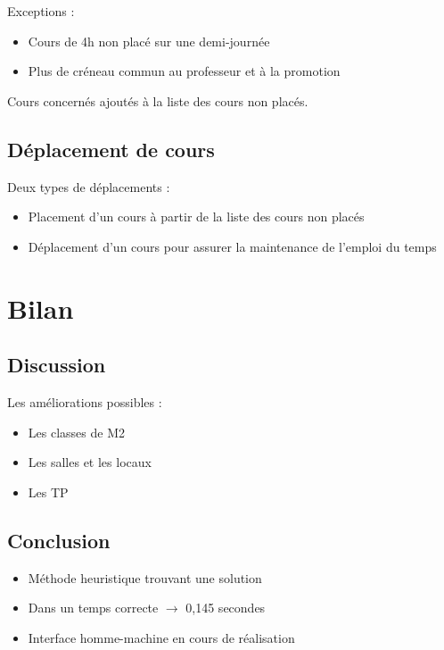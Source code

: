 \documentclass{beamer}
\begin{document}
\begin{frame}
Exceptions :
\begin{itemize}
\item Cours de 4h non placé sur une demi-journée
\item Plus de créneau commun au professeur et à la promotion\\
\end{itemize}
Cours concernés ajoutés à la liste des cours non placés.
\end{frame}

\subsection{Déplacement de cours}
\begin{frame}
Deux types de déplacements :
\begin{itemize}
\item Placement d'un cours à partir de la liste des cours non placés
\item Déplacement d'un cours pour assurer la maintenance de l'emploi du temps
\end{itemize}
\end{frame}

\section{Bilan}
\subsection{Discussion}
\begin{frame}
Les améliorations possibles : 
\begin{itemize}
\item Les classes de M2
\item Les salles et les locaux
\item Les TP
\end{itemize}
\end{frame}

\subsection{Conclusion}
\begin{frame}
\begin{itemize}
\item Méthode heuristique trouvant une solution\\
\item Dans un temps correcte $\rightarrow$ 0,145 secondes\\
\item Interface homme-machine en cours de réalisation
\end{itemize}
\end{frame}
\end{document}
